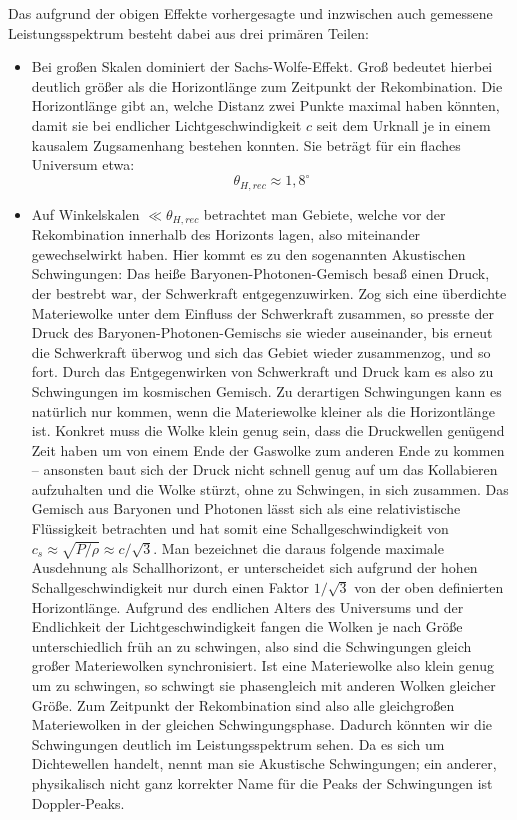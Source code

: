\documentclass[10pt,a4paper]{article}
\begin{document}
Das aufgrund der obigen Effekte vorhergesagte und inzwischen auch gemessene Leistungsspektrum besteht dabei aus drei primären Teilen:
\begin{itemize}
\item Bei großen Skalen dominiert der Sachs-Wolfe-Effekt. Groß bedeutet hierbei deutlich größer als die Horizontlänge zum Zeitpunkt der Rekombination. Die Horizontlänge gibt an, welche Distanz zwei Punkte maximal haben könnten, damit sie bei endlicher Lichtgeschwindigkeit $c$ seit dem Urknall je in einem kausalem Zugsamenhang bestehen konnten. Sie beträgt für ein flaches Universum etwa:
\[ \theta_{H,rec} \approx 1,8^\circ \]
\item Auf Winkelskalen $\ll\theta_{H,rec}$ betrachtet man Gebiete, welche vor der Rekombination innerhalb des Horizonts lagen, also miteinander gewechselwirkt haben. Hier kommt es zu den sogenannten Akustischen Schwingungen:
Das heiße Baryonen-Photonen-Gemisch besaß einen Druck, der bestrebt war, der Schwerkraft entgegenzuwirken. Zog sich eine überdichte Materiewolke unter dem Einfluss der Schwerkraft zusammen, so presste der Druck des Baryonen-Photonen-Gemischs sie wieder auseinander, bis erneut die Schwerkraft überwog und sich das Gebiet wieder zusammenzog, und so fort. Durch das Entgegenwirken von Schwerkraft und Druck kam es also zu Schwingungen im kosmischen Gemisch.
Zu derartigen Schwingungen kann es natürlich nur kommen, wenn die Materiewolke kleiner als die Horizontlänge ist. Konkret muss die Wolke klein genug sein, dass die Druckwellen genügend Zeit haben um von einem Ende der Gaswolke zum anderen Ende zu kommen -- ansonsten baut sich der Druck nicht schnell genug auf um das Kollabieren aufzuhalten und die Wolke stürzt, ohne zu Schwingen, in sich zusammen. Das Gemisch aus Baryonen und Photonen lässt sich als eine relativistische Flüssigkeit betrachten und hat somit eine Schallgeschwindigkeit von $c_s\approx\sqrt{P/\rho}\approx c/\sqrt{3}$.\cite{Schneider} Man bezeichnet die daraus folgende maximale Ausdehnung als Schallhorizont, er unterscheidet sich aufgrund der hohen Schallgeschwindigkeit nur durch einen Faktor $1/\sqrt3$ von der oben definierten Horizontlänge.
Aufgrund des endlichen Alters des Universums und der Endlichkeit der Lichtgeschwindigkeit fangen die Wolken je nach Größe unterschiedlich früh an zu schwingen, also sind die Schwingungen gleich großer Materiewolken synchronisiert. Ist eine Materiewolke also klein genug um zu schwingen, so schwingt sie phasengleich mit anderen Wolken gleicher Größe. Zum Zeitpunkt der Rekombination sind also alle gleichgroßen Materiewolken in der gleichen Schwingungsphase. Dadurch könnten wir die Schwingungen deutlich im Leistungsspektrum sehen. Da es sich um Dichtewellen handelt, nennt man sie Akustische Schwingungen; ein anderer, physikalisch nicht ganz korrekter Name für die Peaks der Schwingungen ist Doppler-Peaks.

\end{itemize}
\end{document}
